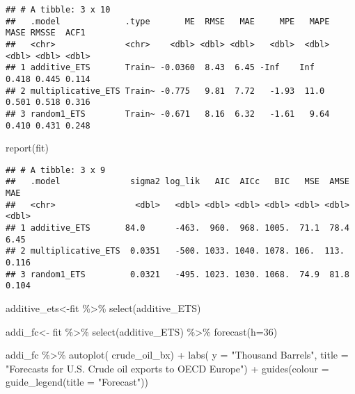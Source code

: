 \documentclass[
]{article}
\newenvironment{Shaded}{\begin{snugshade}}{\end{snugshade}}
\newcommand{\AttributeTok}[1]{\textcolor[rgb]{0.77,0.63,0.00}{#1}}
\newcommand{\DecValTok}[1]{\textcolor[rgb]{0.00,0.00,0.81}{#1}}
\newcommand{\FunctionTok}[1]{\textcolor[rgb]{0.00,0.00,0.00}{#1}}
\newcommand{\NormalTok}[1]{#1}
\newcommand{\OtherTok}[1]{\textcolor[rgb]{0.56,0.35,0.01}{#1}}
\newcommand{\SpecialCharTok}[1]{\textcolor[rgb]{0.00,0.00,0.00}{#1}}
\newcommand{\StringTok}[1]{\textcolor[rgb]{0.31,0.60,0.02}{#1}}
\begin{document}
\begin{verbatim}
## # A tibble: 3 x 10
##   .model             .type       ME  RMSE   MAE     MPE   MAPE  MASE RMSSE  ACF1
##   <chr>              <chr>    <dbl> <dbl> <dbl>   <dbl>  <dbl> <dbl> <dbl> <dbl>
## 1 additive_ETS       Train~ -0.0360  8.43  6.45 -Inf    Inf    0.418 0.445 0.114
## 2 multiplicative_ETS Train~ -0.775   9.81  7.72   -1.93  11.0  0.501 0.518 0.316
## 3 random1_ETS        Train~ -0.671   8.16  6.32   -1.61   9.64 0.410 0.431 0.248
\end{verbatim}

\begin{Shaded}
\begin{Highlighting}[]
\FunctionTok{report}\NormalTok{(fit)}
\end{Highlighting}
\end{Shaded}

\begin{verbatim}
## # A tibble: 3 x 9
##   .model              sigma2 log_lik   AIC  AICc   BIC   MSE  AMSE   MAE
##   <chr>                <dbl>   <dbl> <dbl> <dbl> <dbl> <dbl> <dbl> <dbl>
## 1 additive_ETS       84.0      -463.  960.  968. 1005.  71.1  78.4 6.45 
## 2 multiplicative_ETS  0.0351   -500. 1033. 1040. 1078. 106.  113.  0.116
## 3 random1_ETS         0.0321   -495. 1023. 1030. 1068.  74.9  81.8 0.104
\end{verbatim}

\begin{Shaded}
\begin{Highlighting}[]
\NormalTok{additive\_ets}\OtherTok{\textless{}{-}}\NormalTok{fit }\SpecialCharTok{\%\textgreater{}\%} \FunctionTok{select}\NormalTok{(additive\_ETS)}

\NormalTok{addi\_fc}\OtherTok{\textless{}{-}}\NormalTok{ fit }\SpecialCharTok{\%\textgreater{}\%} \FunctionTok{select}\NormalTok{(additive\_ETS) }\SpecialCharTok{\%\textgreater{}\%} \FunctionTok{forecast}\NormalTok{(}\AttributeTok{h=}\DecValTok{36}\NormalTok{)}

\NormalTok{addi\_fc }\SpecialCharTok{\%\textgreater{}\%} 
  \FunctionTok{autoplot}\NormalTok{(}
\NormalTok{    crude\_oil\_bx) }\SpecialCharTok{+}
  \FunctionTok{labs}\NormalTok{(}
    \AttributeTok{y =} \StringTok{"Thousand Barrels"}\NormalTok{,}
    \AttributeTok{title =} \StringTok{"Forecasts for U.S. Crude oil exports to OECD Europe"}\NormalTok{) }\SpecialCharTok{+}
  \FunctionTok{guides}\NormalTok{(}\AttributeTok{colour =} \FunctionTok{guide\_legend}\NormalTok{(}\AttributeTok{title =} \StringTok{"Forecast"}\NormalTok{))}
\end{Highlighting}
\end{Shaded}
\end{document}
